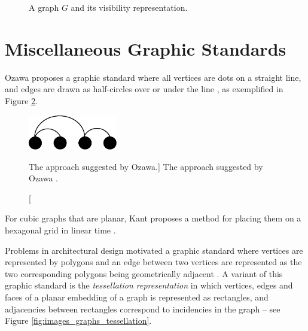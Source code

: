 \begin{figure}[htp]
	\centering
	\caption{A graph $G$ and its visibility representation.}
	\label{fig:images_graphs_visibility_repr_1}
\end{figure}


\section{Miscellaneous Graphic Standards}

Ozawa proposes a graphic standard where all vertices are dots on a straight
line, and edges are drawn as half-circles over or under the line
\cite{Ozawa1980}, as exemplified in Figure \ref{fig:images_graphs_circles_1}.
\begin{figure}[htp]
	\centering
		\includegraphics[height=0.6in]{../images/graphs/circles_1.pdf}
	\caption
	[The approach suggested by Ozawa.]
	{The approach suggested by Ozawa \cite{Ozawa1980}.}
	\label{fig:images_graphs_circles_1}
\end{figure}

For cubic graphs that are planar, Kant proposes a method for placing them on a
hexagonal grid in linear time \cite{Kant1992}.

Problems in architectural design motivated a graphic standard where vertices
are represented by polygons and an edge between two vertices are represented
as the two corresponding polygons being geometrically adjacent
\cite{Bhasker1988}. A variant of this graphic standard is the
\emph{tessellation representation} in which vertices, edges and faces of a
planar embedding of a graph is represented as rectangles, and adjacencies
between rectangles correspond to incidencies in the graph \cite{Tamassia1989}
-- see Figure \ref{fig:images_graphs_tessellation}.

